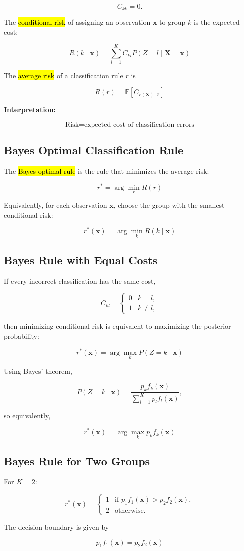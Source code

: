 $$
C_{kk}=0.
$$

The \hl{conditional risk} of assigning an observation $\mathbf{x}$ to group
$k$ is the expected cost:

$$
\boxed{
R(k\mid\mathbf{x})
=
\sum_{l=1}^K
C_{kl}P(Z=l\mid\mathbf{X}=\mathbf{x})
}
$$

The \hl{average risk} of a classification rule $r$ is

$$
\boxed{
R(r)=\mathbb{E}[C_{r(\mathbf{X}),Z}]
}
$$

\textbf{Interpretation:}

$$
\boxed{
\text{Risk}=\text{expected cost of classification errors}
}
$$

\subsection{Bayes Optimal Classification Rule}

The \hl{Bayes optimal rule} is the rule that minimizes the average risk:

$$
\boxed{
r^*=\arg\min_r R(r)
}
$$

Equivalently, for each observation $\mathbf{x}$, choose the group with the
smallest conditional risk:

$$
\boxed{
r^*(\mathbf{x})
=
\arg\min_k R(k\mid\mathbf{x})
}
$$

\subsection{Bayes Rule with Equal Costs}

If every incorrect classification has the same cost,

$$
C_{kl}=
\begin{cases}
0 & k=l,\\
1 & k\neq l,
\end{cases}
$$

then minimizing conditional risk is equivalent to maximizing the posterior
probability:

$$
\boxed{
r^*(\mathbf{x})
=
\arg\max_k P(Z=k\mid\mathbf{x})
}
$$

Using Bayes' theorem,

$$
P(Z=k\mid\mathbf{x})
=
\frac{p_kf_k(\mathbf{x})}
{\displaystyle\sum_{l=1}^Kp_lf_l(\mathbf{x})},
$$

so equivalently,

$$
\boxed{
r^*(\mathbf{x})
=
\arg\max_k p_kf_k(\mathbf{x})
}
$$

\subsection{Bayes Rule for Two Groups}

For $K=2$:

$$
r^*(\mathbf{x})=
\begin{cases}
1 & \text{if }p_1f_1(\mathbf{x})>p_2f_2(\mathbf{x}),\\
2 & \text{otherwise.}
\end{cases}
$$

The decision boundary is given by

$$
\boxed{
p_1f_1(\mathbf{x})=p_2f_2(\mathbf{x})
}
$$